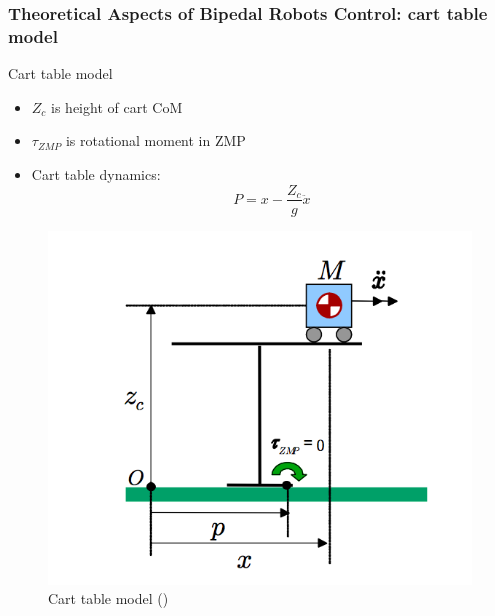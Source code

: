 \documentclass{beamer}
\begin{document}
	\begin{frame}
		\frametitle{Theoretical Aspects of Bipedal Robots Control: cart table model}
		\begin{block}{Cart table model}
			\begin{itemize}
				\item
				$Z_c$ is height of cart CoM
				\item
				$\tau_{ZMP}$ is rotational moment in ZMP
				\item
				Cart table dynamics:
				\begin{equation}
				P = x - \dfrac{Z_c}{g} \ddot{x}
				\end{equation}		
			\end{itemize}
		\end{block}
		
		\begin{figure}[h!]
			\begin{minipage}[H]{\linewidth}
				\centering
				\includegraphics[width=0.4\linewidth]{presentation_images/11}
				\caption{Cart table model (\cite{kajita2003biped})}
			\end{minipage}
		\end{figure}
	\end{frame}
			
\end{document}
